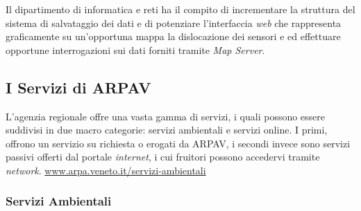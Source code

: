Il dipartimento di informatica e reti ha il compito di incrementare la struttura del sistema di salvataggio dei dati e di potenziare l'interfaccia \textit{web} che rappresenta graficamente su un'opportuna mappa la dislocazione dei sensori e ed effettuare opportune interrogazioni sui dati forniti tramite \textit{Map Server}.

\subsection{I Servizi di ARPAV}

L'agenzia regionale offre una vasta gamma di servizi, i quali possono essere suddivisi in due macro categorie: servizi ambientali e servizi online. I primi, offrono un servizio su richiesta o erogati da ARPAV, i secondi invece sono servizi passivi offerti dal portale \textit{internet}, i cui fruitori possono accedervi tramite \textit{network}.  \url{www.arpa.veneto.it/servizi-ambientali}
\subsubsection{Servizi Ambientali}

